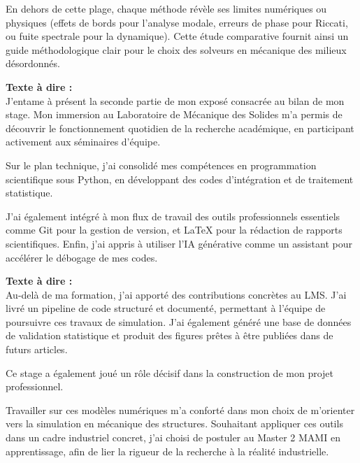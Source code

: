 \documentclass[11pt,a4paper]{article}
\begin{document}
\begin{tcolorbox}[colback=blue!5,colframe=blue!75!black,title=Slide 2 : Table des Matières --- 0:45 à 1:15]
\begin{tcolorbox}[colback=blue!5,colframe=blue!75!black,title=Slide 11 : Synthèse des Méthodes Numériques --- 10:00 à 11:00]
En dehors de cette plage, chaque méthode révèle ses limites numériques ou physiques (effets de bords pour l'analyse modale, erreurs de phase pour Riccati, ou fuite spectrale pour la dynamique). Cette étude comparative fournit ainsi un guide méthodologique clair pour le choix des solveurs en mécanique des milieux désordonnés. \fg{}
\end{tcolorbox}

\begin{tcolorbox}[colback=blue!5,colframe=blue!75!black,title=Slide 12 : Immersion au LMS et Compétences Développées --- 11:00 à 12:00]
\textbf{Texte à dire :} \\
\og  J'entame à présent la seconde partie de mon exposé consacrée au bilan de mon stage. Mon immersion au Laboratoire de Mécanique des Solides m'a permis de découvrir le fonctionnement quotidien de la recherche académique, en participant activement aux séminaires d'équipe. 

Sur le plan technique, j'ai consolidé mes compétences en programmation scientifique sous Python, en développant des codes d'intégration et de traitement statistique. 

J'ai également intégré à mon flux de travail des outils professionnels essentiels comme Git pour la gestion de version, et LaTeX pour la rédaction de rapports scientifiques. Enfin, j'ai appris à utiliser l'IA générative comme un assistant pour accélérer le débogage de mes codes. \fg{}
\end{tcolorbox}

\newpage

\begin{tcolorbox}[colback=blue!5,colframe=blue!75!black,title=Slide 13 : Contributions au LMS \& Choix d'Orientation --- 12:00 à 13:00]
\textbf{Texte à dire :} \\
\og  Au-delà de ma formation, j'ai apporté des contributions concrètes au LMS. J'ai livré un pipeline de code structuré et documenté, permettant à l'équipe de poursuivre ces travaux de simulation. J'ai également généré une base de données de validation statistique et produit des figures prêtes à être publiées dans de futurs articles.

Ce stage a également joué un rôle décisif dans la construction de mon projet professionnel. 

Travailler sur ces modèles numériques m'a conforté dans mon choix de m'orienter vers la simulation en mécanique des structures. Souhaitant appliquer ces outils dans un cadre industriel concret, j'ai choisi de postuler au Master 2 MAMI en apprentissage, afin de lier la rigueur de la recherche à la réalité industrielle. \fg{}
\end{tcolorbox}


\end{tcolorbox}
\end{document}

